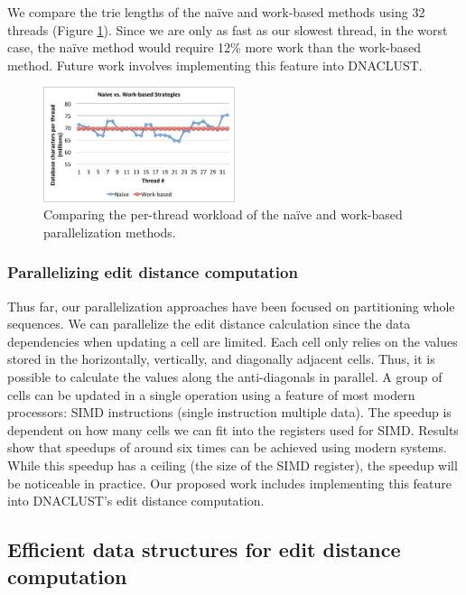 We compare the trie lengths of the na\"ive and work-based methods using 32 threads (Figure \ref{fig:naive_vs_work_strategy}).
Since we are only as fast as our slowest thread, in the worst case, the na\"ive method would require 12\% more work than the work-based method.
Future work involves implementing this feature into DNACLUST.

\begin{figure}[tb]
  \centering
    \includegraphics[width=0.5\textwidth]{naive_vs_work_strategy}
  \caption{Comparing the per-thread workload of the na\"ive and work-based parallelization methods.}
  \label{fig:naive_vs_work_strategy}
\end{figure}


\subsubsection{Parallelizing edit distance computation}

Thus far, our parallelization approaches have been focused on partitioning whole sequences.
We can parallelize the edit distance calculation since the data dependencies when updating a cell are limited.
Each cell only relies on the values stored in the horizontally, vertically, and diagonally adjacent cells.
Thus, it is possible to calculate the values along the anti-diagonals in parallel.
A group of cells can be updated in a single operation using a feature of most modern processors: SIMD instructions (single instruction multiple data).
The speedup is dependent on how many cells we can fit into the registers used for SIMD.
Results show that speedups of around six times can be achieved using modern systems\cite{farrar_striped_2007,rognes_faster_2011}.
While this speedup has a ceiling (the size of the SIMD register), the speedup will be noticeable in practice.
Our proposed work includes implementing this feature into DNACLUST's edit distance computation.

\subsection{Efficient data structures for edit distance computation}

